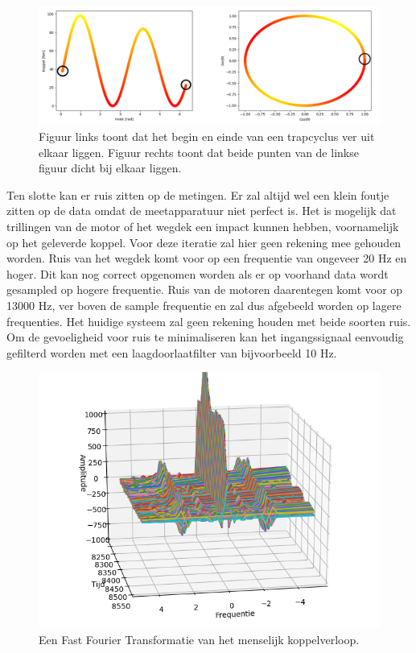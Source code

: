 \begin{figure}[h]
  \centering
  \includegraphics[width=\linewidth]{images/preprocessing-hoek.png}
  \caption{Figuur links toont dat het begin en einde van een trapcyclus ver uit elkaar liggen. Figuur rechts toont dat beide punten van de linkse figuur dicht bij elkaar liggen.}
  \label{fig:preprocessing hoek trapas}
\end{figure}

\noindent Ten slotte kan er ruis zitten op de metingen. Er zal altijd wel een klein foutje zitten op de data omdat de meetapparatuur niet perfect is. Het is mogelijk dat trillingen van de motor of het wegdek een impact kunnen hebben, voornamelijk op het geleverde koppel. Voor deze iteratie zal hier geen rekening mee gehouden worden. Ruis van het wegdek komt voor op een frequentie van ongeveer 20 Hz en hoger. Dit kan nog correct opgenomen worden als er op voorhand data wordt gesampled op hogere frequentie. Ruis van de motoren daarentegen komt voor op 13000 Hz, ver boven de sample frequentie en zal dus afgebeeld worden op lagere frequenties. Het huidige systeem zal geen rekening houden met beide soorten ruis. Om de gevoeligheid voor ruis te minimaliseren kan het ingangssignaal eenvoudig gefilterd worden met een laagdoorlaatfilter van bijvoorbeeld 10 Hz.

\begin{figure}[h]
  \centering
  \includegraphics[width=\linewidth]{images/fft_fietser.png}
  \caption{Een Fast Fourier Transformatie van het menselijk koppelverloop.}
  \label{fig:fft fietser}
\end{figure}

